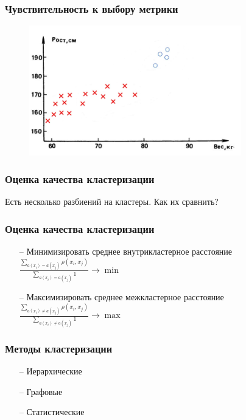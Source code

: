 \documentclass[12pt]{beamer}
\begin{document}
\begin{frame}\frametitle{Чувствительность к выбору метрики}
\begin{figure}[htbp]
  \includegraphics[height=160pt, keepaspectratio = true]{images/students2}  
\end{figure}
\end{frame}

\begin{frame}\frametitle{Оценка качества кластеризации}
Есть несколько разбиений на кластеры. Как их сравнить?
\end{frame}

\begin{frame}\frametitle{Оценка качества кластеризации}
\begin{itemize}
\item[--] Минимизировать среднее внутрикластерное расстояние\\
\vspace{5mm}
${\frac{\sum_{a(x_i) = a(x_j)} \rho(x_i, x_j)}{\sum_{a(x_i) = a(x_j)} 1} \rightarrow \min}$
\item[--] Максимизировать среднее межкластерное расстояние\\
\vspace{5mm}
${\frac{\sum_{a(x_i) \neq a(x_j)} \rho(x_i, x_j)}{\sum_{a(x_i) \neq a(x_j)} 1} \rightarrow \max}$
\end{itemize}
\end{frame}

\begin{frame}\frametitle{Методы кластеризации}
\begin{itemize}
\item[--] Иерархические
\item[--] Графовые 
\item[--] Статистические 
\end{itemize}
\end{frame}

\end{document}
